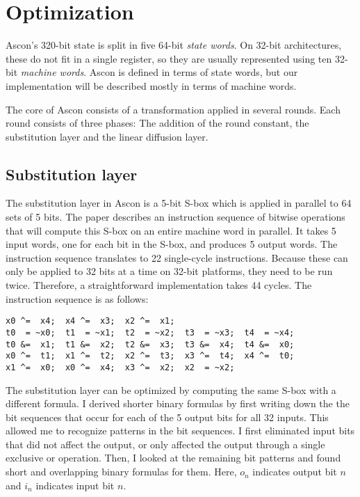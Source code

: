 \section{Optimization}


Ascon's 320-bit state is split in five 64-bit \emph{state words}. On 32-bit
architectures, these do not fit in a single register, so they are usually
represented using ten 32-bit \emph{machine words}. Ascon is defined in terms of
state words, but our implementation will be described mostly in terms of machine
words.

The core of Ascon consists of a transformation applied in several rounds. Each
round consists of three phases: The addition of the round constant, the
substitution layer and the linear diffusion layer.

\subsection{Substitution layer}


The substitution layer in Ascon is a 5-bit S-box which is applied in parallel to
64 sets of 5 bits. The paper describes an instruction sequence of bitwise
operations that will compute this S-box on an entire machine word in parallel.
It takes 5 input words, one for each bit in the S-box, and produces 5 output
words. The instruction sequence translates to 22 single-cycle instructions.
Because these can only be applied to 32 bits at a time on 32-bit platforms, they
need to be run twice. Therefore, a straightforward implementation takes 44
cycles. The instruction sequence is as follows:

\begin{samepage}
\begin{verbatim}
x0 ^=  x4;  x4 ^=  x3;  x2 ^=  x1;
t0  = ~x0;  t1  = ~x1;  t2  = ~x2;  t3  = ~x3;  t4  = ~x4;
t0 &=  x1;  t1 &=  x2;  t2 &=  x3;  t3 &=  x4;  t4 &=  x0;
x0 ^=  t1;  x1 ^=  t2;  x2 ^=  t3;  x3 ^=  t4;  x4 ^=  t0;
x1 ^=  x0;  x0 ^=  x4;  x3 ^=  x2;  x2  = ~x2;
\end{verbatim}
\end{samepage}

The substitution layer can be optimized by computing the same S-box with a
different formula. I derived shorter binary formulas by first writing down the
the bit sequences that occur for each of the 5 output bits for all 32 inputs.
This allowed me to recognize patterns in the bit sequences. I first eliminated
input bits that did not affect the output, or only affected the output through a
single exclusive or operation. Then, I looked at the remaining bit patterns and
found short and overlapping binary formulas for them. Here, $o_n$ indicates
output bit $n$ and $i_n$ indicates input bit $n$.

